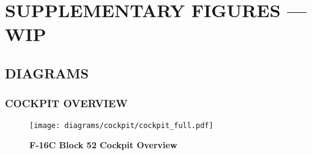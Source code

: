 \appendix
\chapter[SUPP. FIGURES]{SUPPLEMENTARY FIGURES --- WIP}
\localtableofcontents
\thispagestyle{plain}
\cleardoublepage


\section{DIAGRAMS}

\subsection{COCKPIT OVERVIEW}
\begin{figure}[h]
    \centering
    \texttt{[image: diagrams/cockpit/cockpit\_full.pdf]}
    \caption{\textbf{F-16C Block 52 Cockpit Overview}}
    \label{fig:cockpitoverview}
\end{figure}

\cleardoublepage